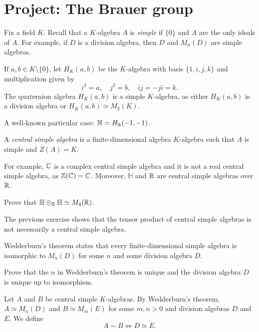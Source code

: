 \section{Project: The Brauer group}

Fix a field $K$. Recall that a $K$-algebra $A$ is \emph{simple} 
if $\{0\}$ and $A$ are the only ideals of $A$. 
For example, if $D$ is a division algebra, then $D$ and $M_n(D)$ are simple algebras. 

\begin{example}
    If $a,b\in K\setminus\{0\}$, let $H_K(a,b)$ be the $K$-algebra 
    with basis $\{1,i,j,k\}$ and multiplication given by
    \[
    i^2=a,\quad
    j^2=b,\quad 
    ij=-ji=k.
    \]
    The quaternion algebra $H_K(a,b)$ is a simple $K$-algebra, as either $H_K(a,b)$ is a division algebra
    or $H_K(a,b)\simeq M_2(K)$. 
\end{example}

A well-known particular case: $\mathbb{H}=H_{\mathbb{R}}(-1,-1)$. 

\begin{definition}
    A \emph{central simple algebra} is a finite-dimensional algebra $K$-algebra
    such that $A$ is simple and $Z(A)=K$.
\end{definition}

For example, $\mathbb{C}$ is a complex central simple algebra and
it is not a real central simple algebra, as $\mathbb{Z}(\mathbb{C})=\mathbb{C}$. Moreover, 
$\mathbb{H}$ and $\mathbb{R}$ are central simple algebras over $\mathbb{R}$.  

\begin{exercise}
    Prove that $\mathbb{H}\otimes_{\mathbb{R}}\mathbb{H}\simeq M_4(\mathbb{R})$.  
\end{exercise}

The previous exercise shows that the tensor product of central simple algebras is not 
necessarily a central simple algebra. 

Wedderburn's theorem states that every finite-dimensional 
simple algebra is isomorphic to $M_n(D)$ 
for some $n$ and some division algebra $D$. 

\begin{exercise}
    Prove that the $n$ in Wedderburn's theorem is unique and
    the division algebra $D$ is unique up to isomorphism. 
\end{exercise}

Let $A$ and $B$ be central simple $K$-algebras. By Wedderburn's theorem, 
$A\simeq M_n(D)$ and $B\simeq M_m(E)$ for some $m,n>0$ and 
division algebras $D$ and $E$. We define 
\[
    A\sim B\Longleftrightarrow D\simeq E.
\]

